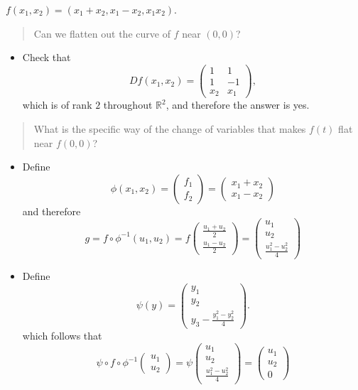 \begin{example}
\begin{enumerate}
$f(x_1,x_2)=(x_1+x_2,x_1-x_2,x_1x_2)$. 
\begin{quotation}
Can we flatten out the curve of $f$ near $(0,0)$?
\end{quotation}
\begin{itemize}
\item
Check that \[
Df(x_1,x_2)=\begin{pmatrix}
1&1\\
1&-1\\
x_2&x_1
\end{pmatrix},
\]
which is of rank $2$ throughout $\mathbb{R}^2$, and therefore the answer is yes.
\end{itemize}
\begin{quotation}
What is the specific way of the change of variables that makes $f(t)$ flat near $f(0,0)$?
\end{quotation}
\begin{itemize}
\item
Define
\[
\phi(x_1,x_2)=\begin{pmatrix}
f_1\\f_2
\end{pmatrix}=\begin{pmatrix}
x_1+x_2\\x_1-x_2
\end{pmatrix}
\]
and therefore
\[
g=f\circ\phi^{-1}(u_1,u_2)=f\begin{pmatrix}
\frac{u_1+u_2}{2}\\\frac{u_1-u_2}{2}
\end{pmatrix}
=
\begin{pmatrix}
u_1\\u_2\\\frac{u_1^2-u_2^2}{4}
\end{pmatrix}
\]
\item
Define 
\[
\psi(y)=\begin{pmatrix}
y_1\\y_2\\y_3-\frac{y_1^2-y_2^2}{4}
\end{pmatrix}.
\]
which follows that
\[
\psi\circ f\circ \phi^{-1}\begin{pmatrix}
u_1\\u_2
\end{pmatrix}=
\psi\begin{pmatrix}
u_1\\u_2\\\frac{u_1^2-u_2^2}{4}
\end{pmatrix}
=
\begin{pmatrix}
u_1\\u_2\\0
\end{pmatrix}
\]
\end{itemize}


\end{enumerate}
\end{example}
